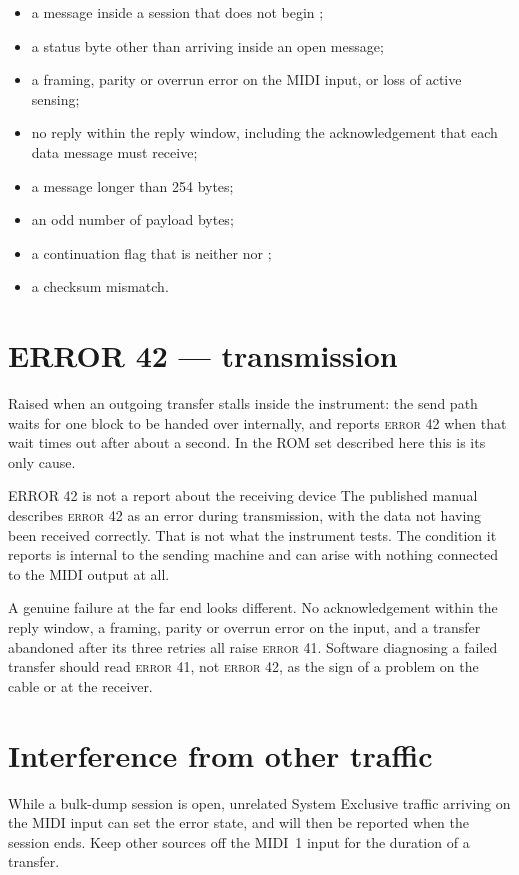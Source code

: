 \begin{itemize}
\item a message inside a session that does not begin ;
\item a status byte other than  arriving inside an open message;
\item a framing, parity or overrun error on the MIDI input, or loss of active sensing;
\item no reply within the reply window, including the acknowledgement that each
  data message must receive;
\item a message longer than 254 bytes;
\item an odd number of payload bytes;
\item a continuation flag that is neither  nor ;
\item a checksum mismatch.
\end{itemize}

\section{ERROR 42 --- transmission}
Raised when an outgoing transfer stalls inside the instrument: the send path waits for one
block to be handed over internally, and reports \textsc{error 42} when that wait times out
after about a second. In the ROM set described here this is its only cause.

\begin{caution}{ERROR 42 is not a report about the receiving device}
The published manual describes \textsc{error 42} as an error during transmission, with the
data not having been received correctly. That is not what the instrument tests. The
condition it reports is internal to the sending machine and can arise with nothing
connected to the MIDI output at all.

A genuine failure at the far end looks different. No acknowledgement within the reply
window, a framing, parity or overrun error on the input, and a transfer abandoned after its
three retries all raise \textsc{error 41}. Software diagnosing a failed transfer should
read \textsc{error 41}, not \textsc{error 42}, as the sign of a problem on the cable or at
the receiver.
\end{caution}

\section{Interference from other traffic}
While a bulk-dump session is open, unrelated System Exclusive traffic arriving on the MIDI
input can set the error state, and will then be reported when the session ends. Keep other
sources off the MIDI~1 input for the duration of a transfer.
